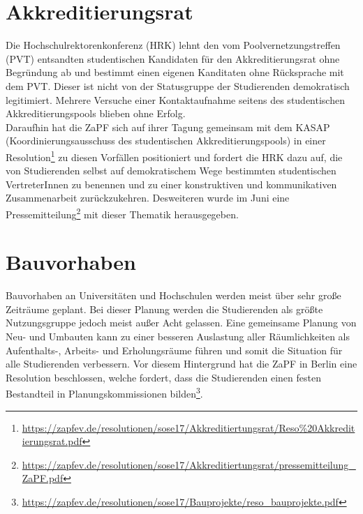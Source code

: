 \documentclass[a4paper]{article}
\begin{document}
\section*{Akkreditierungsrat}
Die Hochschulrektorenkonferenz (HRK) lehnt den vom Poolvernetzungstreffen (PVT) entsandten studentischen Kandidaten für den Akkreditierungsrat ohne Begründung ab und bestimmt einen eigenen Kanditaten ohne Rücksprache mit dem PVT. Dieser ist nicht von der Statusgruppe der Studierenden demokratisch legitimiert. Mehrere Versuche einer Kontaktaufnahme seitens des studentischen Akkreditierungspools blieben ohne Erfolg.\\
Daraufhin hat die ZaPF sich auf ihrer Tagung gemeinsam mit dem KASAP (Koordinierungsausschuss des studentischen Akkreditierungspools) in einer Resolution\footnote{\href{https://zapfev.de/resolutionen/sose17/Akkreditiertungsrat/Reso\%20Akkreditierungsrat.pdf} {\url{https://zapfev.de/resolutionen/sose17/Akkreditiertungsrat/Reso\%20Akkreditierungsrat.pdf}}} zu diesen Vorfällen positioniert und fordert die HRK dazu auf, die von Studierenden selbst auf demokratischem Wege bestimmten studentischen VertreterInnen zu benennen und zu einer konstruktiven und kommunikativen Zusammenarbeit zurückzukehren. Desweiteren wurde im Juni eine Pressemitteilung\footnote{\href{https://zapfev.de/resolutionen/sose17/Akkreditiertungsrat/pressemitteilung_ZaPF.pdf} {\url{https://zapfev.de/resolutionen/sose17/Akkreditiertungsrat/pressemitteilung\_ZaPF.pdf}}} mit dieser Thematik herausgegeben. 


\section*{Bauvorhaben}
Bauvorhaben an Universitäten und Hochschulen werden meist über sehr große Zeiträume geplant. Bei dieser Planung werden die Studierenden als größte Nutzungsgruppe jedoch meist außer Acht gelassen.
Eine gemeinsame Planung von Neu- und Umbauten kann zu einer besseren Auslastung aller Räumlichkeiten als Aufenthalts-, Arbeits- und Erholungsräume führen und somit die Situation für alle Studierenden verbessern. Vor diesem Hintergrund hat die ZaPF in Berlin eine Resolution beschlossen, welche fordert, dass die Studierenden einen festen Bestandteil in Planungskommissionen bilden\footnote{\href{https://zapfev.de/resolutionen/sose17/Bauprojekte/reso_bauprojekte.pdf}{\url{https://zapfev.de/resolutionen/sose17/Bauprojekte/reso_bauprojekte.pdf}}}.
\end{document}
